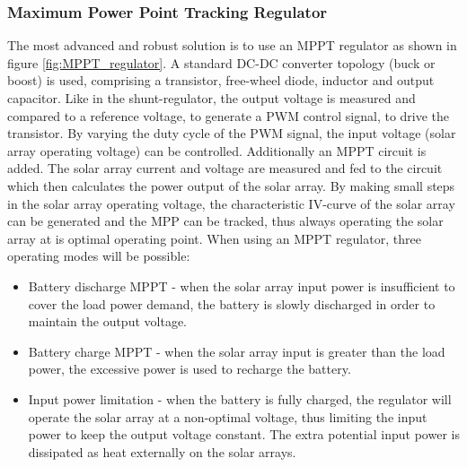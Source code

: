 \subsubsection*{Maximum Power Point Tracking Regulator}
The most advanced and robust solution is to use an \ac{MPPT} regulator as shown in figure \ref{fig:MPPT_regulator}. A standard DC-DC converter topology (buck or boost) is used, comprising a transistor, free-wheel diode, inductor and output capacitor. Like in the shunt-regulator, the output voltage is measured and compared to a reference voltage, to generate a \ac{PWM} control signal, to drive the transistor. By varying the duty cycle of the \ac{PWM} signal, the input voltage (solar array operating voltage) can be controlled. Additionally an \ac{MPPT} circuit is added. The solar array current and voltage are measured and fed to the circuit which then calculates the power output of the solar array. By making small steps in the solar array operating voltage, the characteristic IV-curve of the solar array can be generated and the \ac{MPP} can be tracked, thus always operating the solar array at is optimal operating point. When using an \ac{MPPT} regulator, three operating modes will be possible:
%
\begin{itemize}
\item Battery discharge {MPPT} - when the solar array input power is insufficient to cover the load power demand, the battery is slowly discharged in order to maintain the output voltage.
\item Battery charge {MPPT} - when the solar array input is greater than the load power, the excessive power is used to recharge the battery.
\item Input power limitation - when the battery is fully charged, the regulator will operate the solar array at a non-optimal voltage, thus limiting the input power to keep the output voltage constant. The extra potential input power is dissipated as heat externally on the solar arrays.
\end{itemize}
%
